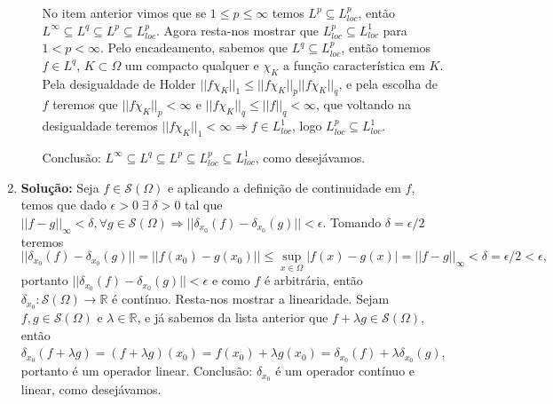 \documentclass{article}
\begin{document}
\begin{enumerate}
\begin{enumerate}
			No item anterior vimos que se $1 \leq p \leq \infty$ temos $L^{p} \subseteq L^{p}_{loc}$, então $L^{\infty} \subseteq L^{q} \subseteq L^{p} \subseteq L^{p}_{loc}$. Agora resta-nos mostrar que $L^{p}_{loc} \subseteq L^{1}_{loc}$ para $1 < p < \infty$. Pelo encadeamento, sabemos que $L^{q}\subseteq L^{p}_{loc}$, então tomemos $f \in L^{q}$, $K \subset \Omega$ um compacto qualquer e $\chi_{K}$ a função característica em $K$. Pela desigualdade de Holder $||f\chi_{K}||_{1} \leq ||f\chi_{K}||_{p}||f\chi_{K}||_{q}$, e pela escolha de $f$ teremos que $||f\chi_{K}||_{p} < \infty$ e $||f\chi_{K}||_{q} \leq ||f||_{q} < \infty$, que voltando na desigualdade teremos $||f\chi_{K}||_{1} < \infty \Rightarrow f \in L^{1}_{loc}$, logo $L^{p}_{loc} \subseteq L^{1}_{loc}$. 
			
			Conclusão: $L^{\infty} \subseteq L^{q} \subseteq L^{p} \subseteq L^{p}_{loc} \subseteq L^{1}_{loc}$, como desejávamos.
		\end{enumerate}
		
		\item \textbf{Solução:} Seja $f \in \mathcal{S}(\Omega)$ e aplicando a definição de continuidade em $f$, temos que dado $\epsilon >0 \; \exists \; \delta >0$ tal que $||f - g||_{\infty} < \delta, \forall g \in \mathcal{S}(\Omega) \Rightarrow ||\delta_{x_0}(f) - \delta_{x_0}(g)|| < \epsilon$. Tomando $\delta = \epsilon/2$ teremos $$
		||\delta_{x_0}(f) - \delta_{x_0}(g)|| = ||f(x_{0}) - g(x_{0})|| \leq \sup_{x \in \Omega}|f(x) -g(x)| = ||f-g||_{\infty} < \delta = \epsilon/2 < \epsilon,
		$$ 
		portanto $||\delta_{x_0}(f) - \delta_{x_0}(g)||<\epsilon$ e como $f$ é arbitrária, então $\delta_{x_{0}} : \mathcal{S}(\Omega) \to \mathbb{R}$ é contínuo. Resta-nos mostrar a linearidade. Sejam $f, g \in \mathcal{S}(\Omega)$ e $\lambda \in \mathbb{R}$, e já sabemos da lista anterior que $f+\lambda g \in \mathcal{S}(\Omega)$, então $\delta_{x_{0}}(f+\lambda g) = (f+\lambda g)(x_{0}) = f(x_{0})+\lambda g(x_{0}) = \delta_{x_{0}}(f) + \lambda \delta_{x_{0}}(g)$, portanto é um operador linear. Conclusão: $\delta_{x_{0}}$ é um operador contínuo e linear, como desejávamos.
		

\end{enumerate}
\end{document}
